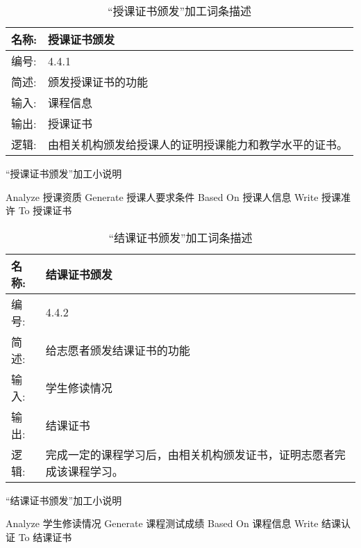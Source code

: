 \begin{table}[H]  
\caption{“授课证书颁发”加工词条描述}  
\begin{center}  
    \begin{tabular}{l p{11cm}} 
        \hline
        \quad 名称: & 授课证书颁发 \\
        \hline
        \quad 编号:  & 4.4.1 \\
        \hline
        \quad 简述:  & 颁发授课证书的功能 \\
        \hline
        \quad 输入:  & 课程信息 \\
        \hline
        \quad 输出:  & 授课证书 \\
        \hline
        \quad 逻辑:  & 由相关机构颁发给授课人的证明授课能力和教学水平的证书。 \\
        \hline
    \end{tabular}
    \label{tab1}
\end{center}
\end{table}

\begin{algorithm}[H]
    \renewcommand{\thealgorithm}{}
    \caption{“授课证书颁发”加工小说明} 
    \label{alg3} 
    \begin{algorithmic}[1]
        \STATE Analyze 授课资质
        \STATE Generate 授课人要求条件 Based On 授课人信息
        \STATE Write 授课准许 To 授课证书
    \end{algorithmic} 
\end{algorithm}

\begin{table}[H]  
\caption{“结课证书颁发”加工词条描述}  
\begin{center}  
    \begin{tabular}{l p{11cm}} 
        \hline
        \quad 名称:  &  结课证书颁发 \\
        \hline
        \quad 编号:  & 4.4.2 \\
        \hline
        \quad 简述:  & 给志愿者颁发结课证书的功能  \\
        \hline
        \quad 输入:  & 学生修读情况 \\
        \hline
        \quad 输出:  & 结课证书 \\
        \hline
        \quad 逻辑:  & 完成一定的课程学习后，由相关机构颁发证书，证明志愿者完成该课程学习。 \\
        \hline
    \end{tabular}
    \label{tab1}
\end{center}
\end{table}

\begin{algorithm}[H]
    \renewcommand{\thealgorithm}{}
    \caption{“结课证书颁发”加工小说明} 
    \label{alg3} 
    \begin{algorithmic}[1]
        \STATE Analyze 学生修读情况
        \STATE Generate 课程测试成绩 Based On 课程信息
        \STATE Write 结课认证 To 结课证书
    \end{algorithmic} 
\end{algorithm}
